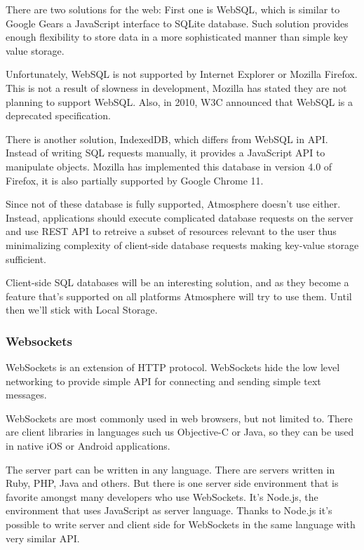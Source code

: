There are two solutions for the web: First one is WebSQL, which is similar to Google Gears a JavaScript interface to SQLite database. Such solution provides enough flexibility to store data in a more sophisticated manner than simple key value storage.

Unfortunately, WebSQL is not supported by Internet Explorer or Mozilla Firefox. This is not a result of slowness in development, Mozilla has stated they are not planning to support WebSQL. \citep{mozilla_indexeddb} Also, in 2010, W3C announced that WebSQL is a deprecated specification. \citep{w3c_webdatabase}

There is another solution, IndexedDB, which differs from WebSQL in API. Instead of writing SQL requests manually, it provides a JavaScript API to manipulate objects. Mozilla has implemented this database in version 4.0 of Firefox, it is also partially supported by Google Chrome 11.

Since not of these database is fully supported, Atmosphere doesn’t use either. Instead, applications should execute complicated database requests on the server and use REST API to retreive a subset of resources relevant to the user thus minimalizing complexity of client-side database requests making key-value storage sufficient.

Client-side SQL databases will be an interesting solution, and as they become a feature that’s supported on all platforms Atmosphere will try to use them. Until then we’ll stick with Local Storage.

\subsubsection{Websockets}

WebSockets is an extension of HTTP protocol. WebSockets hide the low level networking to provide simple API for connecting and sending simple text messages. 

WebSockets are most commonly used in web browsers, but not limited to. There are client libraries in languages such us Objective-C or Java, so they can be used in native iOS or Android applications.

The server part can be written in any language. There are servers written in Ruby, PHP, Java and others. But there is one server side environment that is favorite amongst many developers who use WebSockets. It’s Node.js, the environment that uses JavaScript as server language. Thanks to Node.js it’s possible to write server and client side for WebSockets in the same language with very similar API.  


